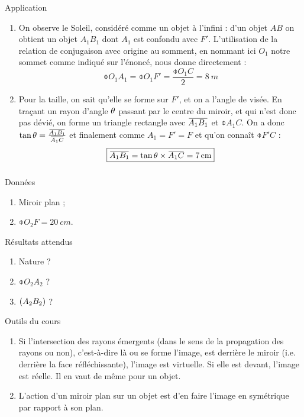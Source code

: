 \documentclass[10pt,a5paper,notitlepage]{book}
\begin{document}
\begin{NCexem}{Application}
    \begin{enumerate}
        \item On observe le Soleil, considéré comme un objet à l'infini : d'un
            objet $AB$ on obtient un objet $A_1B_1$ dont $A_1$ est confondu avec
            $F'$.  L'utilisation de la relation de conjugaison avec origine au
            somment, en nommant ici $O_1$ notre sommet comme indiqué sur
            l'énoncé, nous donne directement : \[ \boxed{\obar{O_1A_1} =
            \obar{O_1F'} = \frac{\obar{O_1C}}{2} = \SI{8}{m}} \]

        \item Pour la taille, on sait qu'elle se forme sur $F'$, et on a l'angle
            de visée. En traçant un rayon d'angle $\theta$ passant par le centre du
            miroir, et qui n'est donc pas dévié, on forme un triangle rectangle
            avec $\ABa$ et $\obar{A_1C}$. On a donc $\tan\t =
            \frac{\ABa}{\obar{A_1C}}$ et finalement comme $A_1 = F' = F$ et
            qu'on connaît $\obar{F'C}$ :
            \[ \boxed{\ABa = \tan\t\times\obar{A_1C} = \SI{7}{cm}} \]
    \end{enumerate}
\end{NCexem}

\subsubsection{}

\begin{NCdefi}{Données}
    \begin{enumerate}
        \item Miroir plan ;
        \item $\obar{O_2F} = \SI{20}{cm}$.
    \end{enumerate}
\end{NCdefi}

\begin{NCprop}{Résultats attendus}
    \begin{enumerate}
        \item Nature ?
        \item $\obar{O_2A_2}$ ?
        \item $\left(A_2B_2\right)$ ?
    \end{enumerate}
\end{NCprop}

\begin{NCdemo}{Outils du cours}
    \begin{enumerate}
        \item Si l'intersection des rayons émergents (dans le sens de la
            propagation des rayons ou non), c'est-à-dire là ou se forme l'image,
            est derrière le miroir (i.e. derrière la face réfléchissante),
            l'image est virtuelle. Si elle est devant, l'image est réelle. Il en
            vaut de même pour un objet.
        \item L'action d'un miroir plan sur un objet est d'en faire l'image en
            symétrique par rapport à son plan.
    \end{enumerate}
\end{NCdemo}
\end{document}
